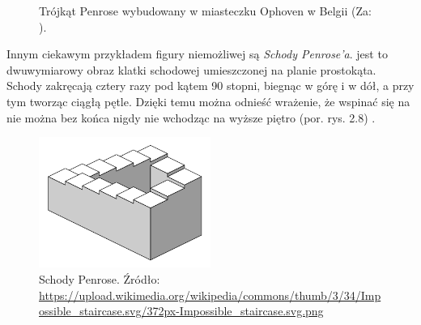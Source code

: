 \documentclass[licencjacka]{kdypl}
\begin{document}
\begin{figure}[H]
     \centering
     \qquad
     \caption{Trójkąt Penrose wybudowany w miasteczku Ophoven w Belgii (Za: \citealt[s. 29-30]{przybylski}).}
     
\end{figure}

Innym ciekawym przykładem figury niemożliwej są \textit{Schody Penrose'a}. jest to dwuwymiarowy obraz klatki schodowej umieszczonej na planie prostokąta. Schody zakręcają cztery razy pod kątem 90 stopni, biegnąc w górę i w dół, a przy tym tworząc ciągłą pętle. Dzięki temu można odnieść wrażenie, że wspinać się na nie można bez końca nigdy nie wchodząc na wyższe piętro (por. rys. 2.8) \citep[s. 71-78]{Bruno}.

\begin{figure}[H]
\includegraphics[width=0.5\textwidth]{schody.png}
\centering
\caption{Schody Penrose. Źródło: \url{https://upload.wikimedia.org/wikipedia/commons/thumb/3/34/Impossible_staircase.svg/372px-Impossible_staircase.svg.png}}
\end{figure}
\end{document}
